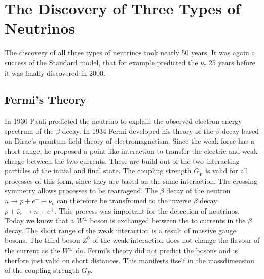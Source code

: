 \section{The Discovery of Three Types of Neutrinos \cite{neutrino}}
The discovery of all three types of neutrinos took nearly 50 years. It was again a success of the Standard model, that for example predicted the $\nu_{\tau}$ 25 years before it was finally discovered in 2000.

\subsection{Fermi's Theory}
In 1930 Pauli predicted the neutrino to explain the observed electron energy spectrum of the $\beta$ decay. In 1934 Fermi developed his theory of the $\beta$ decay based on Dirac's quantum field theory of electromagnetism. Since the weak force has a short range, he proposed a point like interaction to transfer the electric and weak charge between the two currents. These are build out of the two interacting particles of the initial and final state. The coupling strength $G_F$ is valid for all processes of this form, since they are based on the same interaction. The crossing symmetry allows processes to be rearragend. The $\beta$ decay of the neutron $n \rightarrow p + e^- + \bar{\nu}_e$ can therefore be transfromed to the inverse $\beta$ decay $p + \bar{\nu}_e \rightarrow n + e^+$. This process was important for the detection of neutrinos.\\
Today we know that a $W^{\pm}$ boson is exchanged between the to currents in the $\beta$ decay. The short range of the weak interaction is a result of massive gauge bosons. The third boson $Z^0$ of the weak interaction does not change the flavour of the current as the $W^{\pm}$ do. Fermi's theory did not predict the bosons and is therfore just valid on short distances. This manifests itself in the massdimension of the coupling strength $G_F$.

